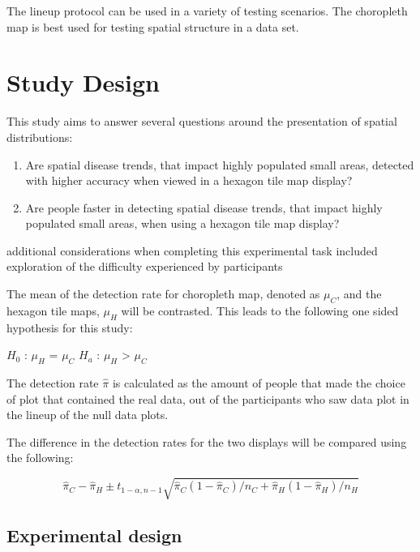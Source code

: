 \documentclass[conference,final,]{IEEEtran}
\begin{document}
The lineup protocol can be used in a variety of testing scenarios. The
choropleth map is best used for testing spatial structure in a data set.

\hypertarget{study-design}{%
\section{Study Design}\label{study-design}}

This study aims to answer several questions around the presentation of
spatial distributions:

\begin{enumerate}
\def\labelenumi{\arabic{enumi}.}
\item
  Are spatial disease trends, that impact highly populated small areas,
  detected with higher accuracy when viewed in a hexagon tile map
  display?
\item
  Are people faster in detecting spatial disease trends, that impact
  highly populated small areas, when using a hexagon tile map display?
\end{enumerate}

additional considerations when completing this experimental task
included exploration of the difficulty experienced by participants

The mean of the detection rate for choropleth map, denoted as \(\mu_C\),
and the hexagon tile maps, \(\mu_H\) will be contrasted. This leads to
the following one sided hypothesis for this study:

\(H_0\) : \(\mu_H\) = \(\mu_C\) \(H_a\) : \(\mu_H\) \textgreater{}
\(\mu_C\)

The detection rate \(\hat\pi\) is calculated as the amount of people
that made the choice of plot that contained the real data, out of the
participants who saw data plot in the lineup of the null data plots.

The difference in the detection rates for the two displays will be
compared using the following:

\[ \hat\pi_C - \hat\pi_H \pm t_{1-\alpha,n-1}\sqrt{\hat\pi_C(1-\hat\pi_C)/n_C + \hat\pi_H(1-\hat\pi_H)/n_H} \]

\hypertarget{experimental-design}{%
\subsection{Experimental design}\label{experimental-design}}
\end{document}
